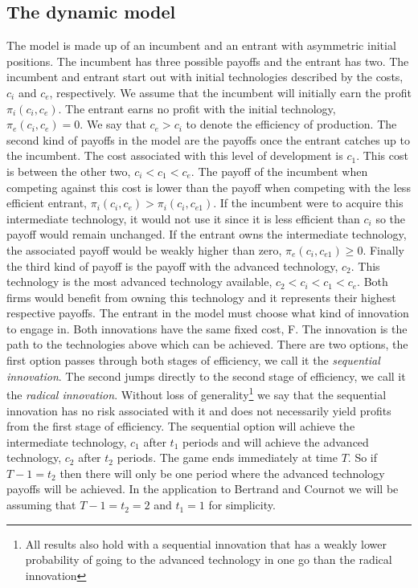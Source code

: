 \documentclass[12pt]{report}
\numberwithin{equation}{section}
\begin{document}
\subsection{The dynamic model}\label{dynamic}
The model is made up of an incumbent and an entrant with asymmetric initial positions. The incumbent has three possible payoffs and the entrant has two. The incumbent and entrant start out with initial technologies described by the costs, $c_i$ and $c_e$, respectively. We assume that the incumbent will initially earn the profit $\pi_i(c_i,c_e)$. The entrant earns no profit with the initial technology, $\pi_e(c_i,c_e)=0$. We say that $c_e>c_i$ to denote the efficiency of production. 
The second kind of payoffs in the model are the payoffs once the entrant catches up to the incumbent. The cost associated with this level of development is $c_{1}$. This cost is between the other two, $c_i<c_{1}<c_e$. The payoff of the incumbent when competing against this cost is lower than the payoff when competing with the less efficient entrant, $ \pi_i( c_i,c_{e}) > \pi_i( c_i, c_{e1} )$. If the incumbent were to acquire this intermediate technology, it would not use it since it is less efficient than $c_i$ so the payoff would remain unchanged. If the entrant owns the intermediate technology, the associated payoff would be weakly higher than zero, $\pi_e(c_i,c_{e1}) \geq 0$.
Finally the third kind of payoff is the payoff with the advanced technology, $c_2$. This technology is the most advanced technology available, $c_2<c_i<c_1<c_e$. Both firms would benefit from owning this technology and it represents their highest respective payoffs. 
The entrant in the model must choose what kind of innovation to engage in. Both innovations have the same fixed cost, F. The innovation is the path to the technologies above which can be achieved. There are two options, the first option passes through both stages of efficiency, we call it the \textit{sequential innovation}. The second jumps directly to the second stage of efficiency, we call it the \textit{radical innovation}.  
Without loss of generality\footnote{All results also hold with a sequential innovation that has a weakly lower probability of going to the advanced technology in one go than the radical innovation} we say that the sequential innovation has no risk associated with it and does not necessarily yield profits from the first stage of efficiency. The sequential option will achieve the intermediate technology, $c_1$ after $t_1$ periods and will achieve the advanced technology, $c_2$ after $t_2$ periods. The game ends immediately at time $T$. So if $T-1=t_2$ then there will only be one period where the advanced technology payoffs will be achieved. In the application to Bertrand and Cournot we will be assuming that $T-1=t_2=2$ and $t_1=1$ for simplicity. 
\end{document}
